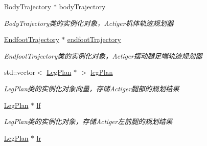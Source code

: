 \begin{DoxyCompactItemize}
\mbox{\label{classquadruped_1_1MotionPlan_a4aefeb143bd9bb2e0e0460b90dc3b43f}} 
\hyperlink{classquadruped_1_1BodyTrajectory}{Body\+Trajectory} $\ast$ \hyperlink{classquadruped_1_1MotionPlan_a4aefeb143bd9bb2e0e0460b90dc3b43f}{body\+Trajectory}
\begin{DoxyCompactList}\small\item\em Body\+Trajectory类的实例化对象，\+Actiger机体轨迹规划器 \end{DoxyCompactList}\item 
\mbox{\label{classquadruped_1_1MotionPlan_ab2272c920c3b4311023fb4c1103436ad}} 
\hyperlink{classquadruped_1_1EndfootTrajectory}{Endfoot\+Trajectory} $\ast$ \hyperlink{classquadruped_1_1MotionPlan_ab2272c920c3b4311023fb4c1103436ad}{endfoot\+Trajectory}
\begin{DoxyCompactList}\small\item\em Endfoot\+Trajectory类的实例化对象，\+Actiger摆动腿足端轨迹规划器 \end{DoxyCompactList}\item 
\mbox{\label{classquadruped_1_1MotionPlan_a58280188cf51d2e936d6dc4aa7520859}} 
std\+::vector$<$ \hyperlink{classquadruped_1_1LegPlan}{Leg\+Plan} $\ast$ $>$ \hyperlink{classquadruped_1_1MotionPlan_a58280188cf51d2e936d6dc4aa7520859}{leg\+Plan}
\begin{DoxyCompactList}\small\item\em Leg\+Plan类的实例化对象向量，存储\+Actiger腿部的规划结果 \end{DoxyCompactList}\item 
\mbox{\label{classquadruped_1_1MotionPlan_a8efab4af4a0c1264204a0d12baeb5494}} 
\hyperlink{classquadruped_1_1LegPlan}{Leg\+Plan} $\ast$ \hyperlink{classquadruped_1_1MotionPlan_a8efab4af4a0c1264204a0d12baeb5494}{lf}
\begin{DoxyCompactList}\small\item\em Leg\+Plan类的实例化对象，存储\+Actiger左前腿的规划结果 \end{DoxyCompactList}\item 
\mbox{\label{classquadruped_1_1MotionPlan_a05dd0137376852bb6feee04f6193c5f6}} 
\hyperlink{classquadruped_1_1LegPlan}{Leg\+Plan} $\ast$ \hyperlink{classquadruped_1_1MotionPlan_a05dd0137376852bb6feee04f6193c5f6}{lr}

\end{DoxyCompactItemize}

